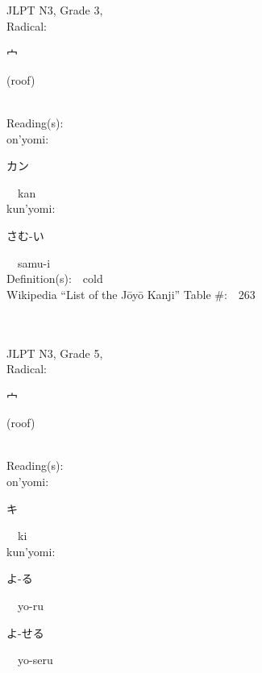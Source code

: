 \begin{multicols}{2}
{JLPT N3, Grade 3, \\Radical:\ \ {\begin{CJK}{UTF8}{min} 宀 \end{CJK}} (roof) } \\
Reading(s):\ \ \\
{\hspace*{1em}}on'yomi:\ \ \\
{\hspace*{2em}}{\begin{CJK}{UTF8}{min} カン \end{CJK}}\ \ kan\ \ \\
{\hspace*{1em}}kun'yomi:\ \ \\
{\hspace*{2em}}{\begin{CJK}{UTF8}{min} さむ-い \end{CJK}}\ \ samu-i\ \ \\
Definition(s):\ \ cold \\
Wikipedia ``List of the J\=oy\=o Kanji'' Table \#:\ \ 263 \\
\ \ \\
{\fontsize{34pt}{40pt}  }\ \ \\  %
{JLPT N3, Grade 5, \\Radical:\ \ {\begin{CJK}{UTF8}{min} 宀 \end{CJK}} (roof) } \\
Reading(s):\ \ \\
{\hspace*{1em}}on'yomi:\ \ \\
{\hspace*{2em}}{\begin{CJK}{UTF8}{min} キ \end{CJK}}\ \ ki\ \ \\
{\hspace*{1em}}kun'yomi:\ \ \\
{\hspace*{2em}}{\begin{CJK}{UTF8}{min} よ-る \end{CJK}}\ \ yo-ru\ \ \\
{\hspace*{2em}}{\begin{CJK}{UTF8}{min} よ-せる \end{CJK}}\ \ yo-seru\ \ \\

\end{multicols}
